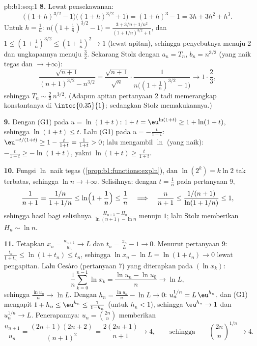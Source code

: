 \begin{solution}{pb:b1:seq:1}
\textbf{8.} Lewat pensekawanan:
\[
\bigl((1+h)^{3/2} - 1\bigr)\bigl((1+h)^{3/2} + 1\bigr)
= (1+h)^3 - 1 = 3h + 3h^2 + h^3 .
\]
Untuk $h = \frac1n$: $n\bigl((1 + \frac1n)^{3/2} - 1\bigr) =
\frac{3 + 3/n + 1/n^2}{(1 + 1/n)^{3/2} + 1}$, dan $1 \leq (1 +
\frac1n)^{3/2} \leq (1 + \frac1n)^2 \to 1$ (lewat apitan), sehingga
penyebutnya menuju $2$ dan ungkapannya menuju $\frac32$. Sekarang
Stolz dengan $a_n = T_n$, $b_n = n^{3/2}$ (yang naik tegas dan
$\to +\infty$):
\[
\frac{\sqrt{n+1}}{(n+1)^{3/2} - n^{3/2}}
= \frac{\sqrt{n+1}}{\sqrt n} \cdot
\frac{1}{n\bigl((1 + \frac1n)^{3/2} - 1\bigr)}
\longrightarrow 1 \cdot \frac{2}{3},
\]
sehingga $T_n \sim \frac23\,n^{3/2}$. (Adapun apitan pertanyaan 2
tadi memerangkap konstantanya di $\intcc{0.35}{1}$; sedangkan Stolz memakukannya.)

\textbf{9.} Dengan (G1) pada $u = \ln(1+t)$: $1 + t = \eu^{\ln(1+t)} \geq
1 + \ln(1+t)$, sehingga $\ln(1+t) \leq t$. Lalu (G1) pada $u =
-\frac{t}{1+t}$: $\eu^{-t/(1+t)} \geq 1 - \frac{t}{1+t} =
\frac{1}{1+t} > 0$; lalu mengambil $\ln$ (yang naik):
$-\frac{t}{1+t} \geq -\ln(1+t)$, yakni $\ln(1+t) \geq
\frac{t}{1+t}$.

\textbf{10.} Fungsi $\ln$ naik tegas
(\cref{prop:b1:functions:expln}), dan $\ln(2^k) = k\ln 2$
tak terbatas, sehingga $\ln n \to +\infty$. Selisihnya: dengan $t =
\frac1n$ pada pertanyaan 9,
\[
\frac 1{n+1} = \frac{1/n}{1 + 1/n} \leq
\ln\Bigl(1 + \frac1n\Bigr) \leq \frac1n
\quad\Longrightarrow\quad
\frac{n}{n+1} \leq \frac{1/(n+1)}{\ln(1 + 1/n)} \leq 1 ,
\]
sehingga hasil bagi selisihnya $\frac{H_{n+1} - H_n}{\ln(n+1) - \ln
n}$ menuju $1$; lalu Stolz memberikan $H_n \sim \ln n$.

\textbf{11.} Tetapkan $x_n = \frac{u_{n+1}}{u_n} \to L$ dan $t_n =
\frac{x_n}{L} - 1 \to 0$. Menurut pertanyaan 9: $\frac{t_n}{1 + t_n} \leq
\ln(1 + t_n) \leq t_n$, sehingga $\ln x_n - \ln L = \ln(1 + t_n) \to
0$ lewat pengapitan. Lalu Cesàro (pertanyaan 7) yang diterapkan pada $(\ln x_k)$:
\[
\frac1n \sum_{k=0}^{n-1} \ln x_k = \frac{\ln u_n - \ln u_0}{n}
\longrightarrow \ln L ,
\]
sehingga $\frac{\ln u_n}{n} \to \ln L$. Dengan $h_n = \frac{\ln u_n}{n}
- \ln L \to 0$: $u_n^{1/n} = L\,\eu^{h_n}$, dan (G1) mengapit
$1 + h_n \leq \eu^{h_n} \leq \frac{1}{1 - h_n}$ (untuk $h_n < 1$),
sehingga $\eu^{h_n} \to 1$ dan $u_n^{1/n} \to L$. Penerapannya: $u_n =
\binom{2n}{n}$ memberikan
\[
\frac{u_{n+1}}{u_n} = \frac{(2n+1)(2n+2)}{(n+1)^2}
= \frac{2(2n+1)}{n+1} \longrightarrow 4 ,
\qquad\text{sehingga}\qquad
\binom{2n}{n}^{1/n} \to 4 .
\]


\end{solution}
